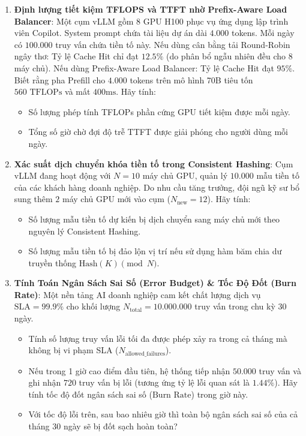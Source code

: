 \begin{enumerate}[label=\textbf{B\arabic*.}]
  \item \textbf{Định lượng tiết kiệm TFLOPS và TTFT nhờ Prefix-Aware Load Balancer}:
  Một cụm vLLM gồm 8 GPU H100 phục vụ ứng dụng lập trình viên Copilot.
  System prompt chứa tài liệu dự án dài $4.000$ tokens. Mỗi ngày có $100.000$ truy vấn chứa tiền tố này.
  Nếu dùng cân bằng tải Round-Robin ngây thơ: Tỷ lệ Cache Hit chỉ đạt $12.5\%$ (do phân bổ ngẫu nhiên đều cho 8 máy chủ).
  Nếu dùng Prefix-Aware Load Balancer: Tỷ lệ Cache Hit đạt $95\%$.
  Biết rằng pha Prefill cho $4.000$ tokens trên mô hình 70B tiêu tốn $560\text{ TFLOPs}$ và mất $400\text{ms}$.
  Hãy tính:
  \begin{itemize}
    \item[a)] Số lượng phép tính TFLOPs phần cứng GPU tiết kiệm được mỗi ngày.
    \item[b)] Tổng số giờ chờ đợi độ trễ TTFT được giải phóng cho người dùng mỗi ngày.
  \end{itemize}

  \item \textbf{Xác suất dịch chuyển khóa tiền tố trong Consistent Hashing}:
  Cụm vLLM đang hoạt động với $N = 10$ máy chủ GPU, quản lý $10.000$ mẫu tiền tố của các khách hàng doanh nghiệp.
  Do nhu cầu tăng trưởng, đội ngũ kỹ sư bổ sung thêm $2$ máy chủ GPU mới vào cụm ($N_{\text{new}} = 12$).
  Hãy tính:
  \begin{itemize}
    \item[a)] Số lượng mẫu tiền tố dự kiến bị dịch chuyển sang máy chủ mới theo nguyên lý Consistent Hashing.
    \item[b)] Số lượng mẫu tiền tố bị đảo lộn vị trí nếu sử dụng hàm băm chia dư truyền thống $\text{Hash}(K) \pmod N$.
  \end{itemize}

  \item \textbf{Tính Toán Ngân Sách Sai Số (Error Budget) \& Tốc Độ Đốt (Burn Rate)}:
  Một nền tảng AI doanh nghiệp cam kết chất lượng dịch vụ $\text{SLA} = 99.9\%$ cho khối lượng $N_{\text{total}} = 10.000.000$ truy vấn trong chu kỳ 30 ngày.
  \begin{itemize}
    \item[a)] Tính số lượng truy vấn lỗi tối đa được phép xảy ra trong cả tháng mà không bị vi phạm SLA ($N_{\text{allowed\_failures}}$).
    \item[b)] Nếu trong 1 giờ cao điểm đầu tiên, hệ thống tiếp nhận $50.000$ truy vấn và ghi nhận $720$ truy vấn bị lỗi (tương ứng tỷ lệ lỗi quan sát là $1.44\%$). Hãy tính tốc độ đốt ngân sách sai số ($\text{Burn Rate}$) trong giờ này.
    \item[c)] Với tốc độ lỗi trên, sau bao nhiêu giờ thì toàn bộ ngân sách sai số của cả tháng 30 ngày sẽ bị đốt sạch hoàn toàn?
  \end{itemize}


\end{enumerate}
